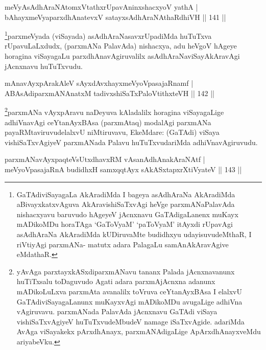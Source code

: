 
\begin{shl}
meVyAsAdhAraNAtomxVtathxrUpavAninxshacxyoV yathA |\\
bAhayxmeVyaparxdhAnatevxV satayxsAdhAraNAthaRdhiVH \hfill || 141 ||
\end{shl}

\begin{artha}
\footnote[2]{GaTAdiviSayagaLa AkAradiMda I bageya asAdhAraNa AkAradiMda aBivayxkatxvAguva AkAravishiSaTxvAgi heVge parxmANaPalavAda nishacxyavu baruvudo hAgeyeV jAcnxnavu GaTAdigaLanenx muKayx mADikoMDu horaTAga `GaToV\s yaM' `paToV\s yaM' itAyxdi rUpavAgi asAdhAraNa AkAradiMda kUDiruvaMte budidhxyu udayisuvudeMthaR, I riVtiyAgi parxmANa- matutx adara PalagaLu samAnAkAravAgive eMdathaR.}parxmeVyada (viSayada) asAdhAraNasavxrUpadiMda huTuTxva rUpavuLaLxdudx, (parxmANa PalavAda) nishacxya, adu heVgoV hAgeye horagina viSayagaLu parxdhAnavAgiruvalilx asAdhAraNaviSayAkAravAgi jAcnxnavu huTuTxvudu.
\end{artha}


\begin{shl}
mAnavAyxpArakAleV sAyxdAvxhayxmeVyoVpasajaRnamf |\\
ABAsAdiparxmANAnatxM tadivxshiSaTxPaloVtithxteVH \hfill || 142 ||
\end{shl}

\begin{artha}
\footnote[1]{yAvAga parxtayxkASxdiparxmANavu tananx Palada jAcnxnavanunx huTiTxsalu toDaguvudo Agati adara parxmAjAcnxna adanunx mADikoLuLxva parxmAta avanalilx toVruva ceYtanAyxBAsa I elalxvU GaTAdiviSayagaLanunx muKayxvAgi mADikoMDu avugaLige adhiVna vAgiruvavu. parxmANada PalavAda jAcnxnavu GaTAdi viSaya vishiSaTxvAgiyeV huTuTxvudeMbudeV namage iSaTxvAgide. adariMda AvAga viSayakekx pArxdhAnayx, parxmANAdigaLige ApArxdhAnayxveMdu ariyabeVku.}parxmANa vAyxpAravu naDeyuva kAladalilx horagina viSayagaLige adhiVnavAgi ceYtanAyxBAsa (parxmAtaq) modalAgi parxmANa payaRMtaviruvudelalxvU niMtiruvavu, EkeMdare: (GaTAdi) viSaya vishiSaTxvAgiyeV parxmANada Palavu huTuTxvudariMda adhiVnavAgiruvudu.
\end{artha}


\begin{shl}
parxmANavAyxpaqteVsUtxdhavxRM vAsanAdhAnakAraNAtf |\\
meVyoVpasajaRnA budidhxH samxqqtAyx sAkASxtapxrXtiVyateV \hfill || 143 ||
\end{shl}

